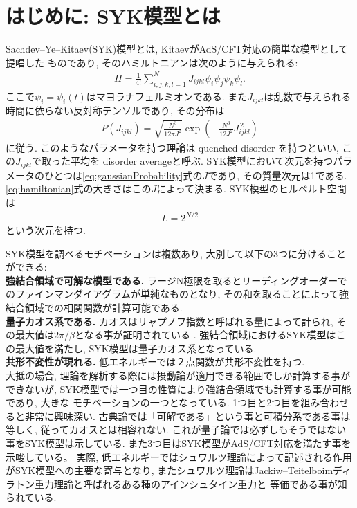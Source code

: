 \section{はじめに: SYK模型とは}
Sachdev--Ye--Kitaev(SYK)模型とは, KitaevがAdS/CFT対応の簡単な模型として提唱した
ものであり, そのハミルトニアンは次のように与えられる:
\begin{align}
  H = \frac{1}{4!}\sum_{i,j,k,l = 1}^{N} J_{ijkl}\psi_i\psi_j\psi_k\psi_l.
  \label{eq:hamiltonian}
\end{align}
ここで$\psi_i = \psi_i(t)$はマヨラナフェルミオンである. 
また$J_{ijkl}$は乱数で与えられる時間に依らない反対称テンソルであり, その分布は
\begin{align}
  P(J_{ijkl}) = \sqrt{\frac{N^3}{12\pi J^2}}
                \exp\left(-\frac{N^3}{12J^2}J_{ijkl}^{\, 2}\right)
	\label{eq:gaussianProbability}
\end{align}
に従う. 
このようなパラメータを持つ理論は quenched disorder を持つといい, 
この$J_{ijkl}$で取った平均を disorder averageと呼ぶ. 
SYK模型において次元を持つパラメータのひとつは\eqref{eq:gaussianProbability}式の$J$であり, 
その質量次元は1である. \eqref{eq:hamiltonian}式の大きさはこの$J$によって決まる. 
SYK模型のヒルベルト空間は
\begin{align}
	L = 2^{N/2}
\end{align}
という次元を持つ. 

SYK模型を調べるモチベーションは複数あり, 大別して以下の3つに分けることができる:\\

\textbf{強結合領域で可解な模型である.}
ラージN極限を取るとリーディングオーダーでのファインマンダイアグラムが単純なものとなり, 
その和を取ることによって強結合領域での相関関数が計算可能である. \\

\textbf{量子カオス系である.}
カオスはリャプノフ指数と呼ばれる量によって計られ, 
その最大値は$2\pi / \beta$となる事が証明されている \cite{shenker}. 
強結合領域におけるSYK模型はこの最大値を満たし\cite{maldacena}, 
SYK模型は量子カオス系となっている. \\

\textbf{共形不変性が現れる.}
低エネルギーでは２点関数が共形不変性を持つ. \\

大抵の場合, 理論を解析する際には摂動論が適用できる範囲でしか計算する事ができないが, 
SYK模型では一つ目の性質により強結合領域でも計算する事が可能であり, 大きな
モチベーションの一つとなっている. 
1つ目と2つ目を組み合わせると非常に興味深い. 
古典論では「可解である」という事と可積分系である事は等しく, 従ってカオスとは相容れない\cite{polchinski}. 
これが量子論では必ずしもそうではない事をSYK模型は示している. 
また3つ目はSYK模型がAdS/CFT対応を満たす事を示唆している。
実際, 低エネルギーではシュワルツ理論によって記述される作用がSYK模型への主要な寄与となり, 
またシュワルツ理論はJackiw--Teitelboimディラトン重力理論と呼ばれるある種のアインシュタイン重力と
等価である事が知られている.

